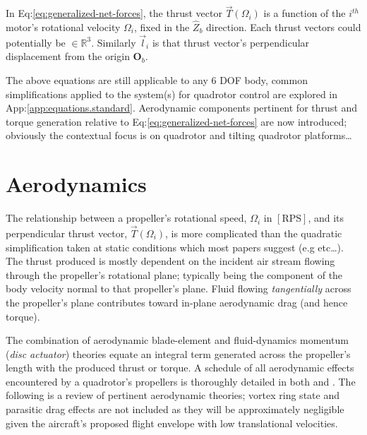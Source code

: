 In Eq:\ref{eq:generalized-net-forces}, the thrust vector $\vec{T}(\Omega_i)$ is a function of the $i^{th}$ motor's rotational velocity $\Omega_i$, fixed in the $\hat{Z}_b$ direction. Each thrust vectors could potentially be $\in\mathbb{R}^3$. Similarly $\vec{l}_i$ is that thrust vector's perpendicular displacement from the origin $\mathbf{O}_b$. 
\par
The above equations are still applicable to any 6 DOF body, common simplifications applied to the system(s) for quadrotor control are explored in App:\ref{app:equations.standard}. Aerodynamic components pertinent for thrust and torque generation relative to Eq:\ref{eq:generalized-net-forces} are now introduced; obviously the contextual focus is on quadrotor and tilting quadrotor platforms\ldots
\section{Aerodynamics}
\label{sec:dynamics.aero}
The relationship between a propeller's rotational speed, $\Omega_i$ in $[\text{RPS}]$, and its perpendicular thrust vector, $\vec{T}(\Omega_i)$, is more complicated than the quadratic simplification taken at static conditions which most papers suggest (e.g \cite{x4flyer,modelingquadcopter} etc\ldots). The thrust produced is mostly dependent on the incident air stream flowing through the propeller's rotational plane; typically being the component of the body velocity normal to that propeller's plane. Fluid flowing \emph{tangentially} across the propeller's plane contributes toward in-plane aerodynamic drag (and hence torque). 
\par
The combination of aerodynamic blade-element\cite{bem,forwarddescent} and fluid-dynamics momentum (\emph{disc actuator}) theories equate an integral term generated across the propeller's length with the produced thrust or torque. A schedule of all aerodynamic effects encountered by a quadrotor's propellers is thoroughly detailed in both \cite{bladesforquadrotors} and \cite{nonlineardynamics}. The following is a review of pertinent aerodynamic theories; vortex ring state and parasitic drag effects are not included as they will be approximately negligible given the aircraft's proposed flight envelope with low translational velocities.
